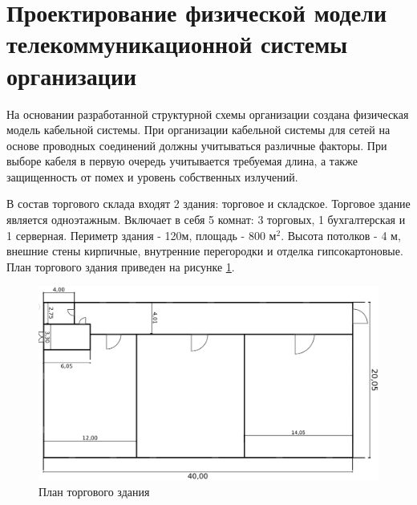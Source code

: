 \section{Проектирование физической модели телекоммуникационной системы организации}
\label{sec:3}
На основании разработанной структурной схемы организации создана физическая модель кабельной системы. При организации кабельной системы для сетей на основе проводных соединений должны учитываться различные факторы. При выборе кабеля в первую очередь учитывается требуемая длина, а также защищенность от помех и уровень собственных излучений. 

В состав торгового склада входят 2 здания: торговое и складское. Торговое здание является одноэтажным. Включает в себя 5 комнат: 3 торговых, 1 бухгалтерская и 1 серверная. Периметр здания \hyp{} 120м, площадь \hyp{} 800 $\text{м}^2$. Высота потолков \hyp{} 4 м, внешние стены кирпичные, внутренние перегородки и отделка гипсокартоновые. План торгового здания приведен на рисунке \ref{fig:shop-plane}.
\begin{figure}[H]
  \centering
  \includegraphics[width=\linewidth]{sec3/img/shop-plane.png}
  \caption{План торгового здания}
  \label{fig:shop-plane}
\end{figure}


